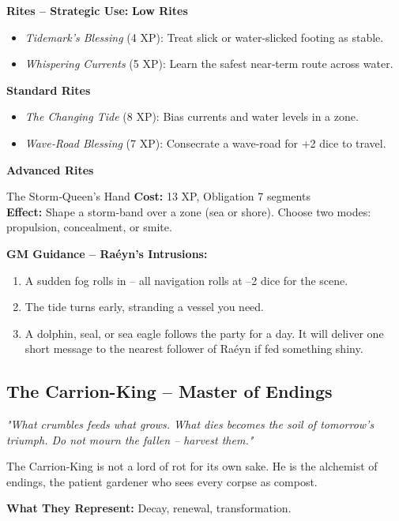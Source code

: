 \documentclass[10pt,a5paper]{book}
\begin{document}
\textbf{Rites -- Strategic Use:}
\textbf{Low Rites}
\begin{itemize}
    \item \textit{Tidemark's Blessing} (4 XP): Treat slick or water-slicked footing as stable.
    \item \textit{Whispering Currents} (5 XP): Learn the safest near‑term route across water.
\end{itemize}
\textbf{Standard Rites}
\begin{itemize}
    \item \textit{The Changing Tide} (8 XP): Bias currents and water levels in a zone.
    \item \textit{Wave‑Road Blessing} (7 XP): Consecrate a wave‑road for +2 dice to travel.
\end{itemize}
\textbf{Advanced Rites}
\begin{patronbox}{The Storm‑Queen's Hand}
\textbf{Cost:} 13 XP, Obligation 7 segments \\
\textbf{Effect:} Shape a storm‑band over a zone (sea or shore). Choose two modes: propulsion, concealment, or smite.
\end{patronbox}

\textbf{GM Guidance -- Raéyn's Intrusions:}
\begin{enumerate}
    \item A sudden fog rolls in -- all navigation rolls at --2 dice for the scene.
    \item The tide turns early, stranding a vessel you need.
    \item A dolphin, seal, or sea eagle follows the party for a day. It will deliver one short message to the nearest follower of Raéyn if fed something shiny.
\end{enumerate}

\clearpage

\subsection{The Carrion-King -- Master of Endings}
\label{patron:carrionking}

\textit{"What crumbles feeds what grows. What dies becomes the soil of tomorrow's triumph. Do not mourn the fallen -- harvest them."}

The Carrion‑King is not a lord of rot for its own sake. He is the alchemist of endings, the patient gardener who sees every corpse as compost.

\textbf{What They Represent:} Decay, renewal, transformation.
\end{document}
